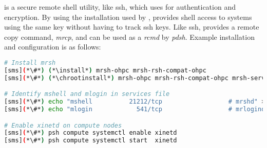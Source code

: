 \mrsh{} is a secure remote shell utility, like ssh, which uses \MUNGE{} 
for authentication and encryption. By using the \MUNGE{} installation used by 
\SLURM{}, \mrsh{} provides shell access to systems using the same \MUNGE{} key 
without having to track {ssh} keys. Like {ssh}, \mrsh{} provides a 
remote copy command, {\em mrcp}, and can be used as a {\em rcmd} by {\em
pdsh}. Example installation and configuration is as follows:

\begin{lstlisting}[language=bash,keywords={},upquote=true]
# Install mrsh
[sms](*\#*) (*\install*) mrsh-ohpc mrsh-rsh-compat-ohpc
[sms](*\#*) (*\chrootinstall*) mrsh-ohpc mrsh-rsh-compat-ohpc mrsh-server-ohpc

# Identify mshell and mlogin in services file
[sms](*\#*) echo "mshell          21212/tcp                  # mrshd" >> /etc/services
[sms](*\#*) echo "mlogin            541/tcp                  # mrlogind" >> /etc/services

# Enable xinetd on compute nodes
[sms](*\#*) psh compute systemctl enable xinetd
[sms](*\#*) psh compute systemctl start  xinetd
\end{lstlisting}

